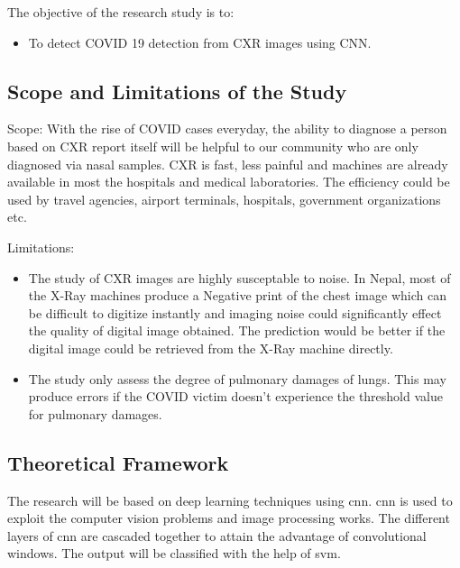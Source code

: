 The objective of the research study is to:
\begin{itemize}
    \item  To detect COVID 19 detection from CXR images using CNN. 
\end{itemize}

\subsection{Scope and Limitations of the Study}

Scope: With the rise of COVID cases everyday, the ability to diagnose a person based on CXR report itself will be helpful to our community who are only diagnosed via nasal samples. CXR is fast, less painful and machines are already available in most the hospitals and medical laboratories. The efficiency could be used by travel agencies, airport terminals, hospitals, government organizations etc.

\vspace{10pt}
Limitations:
\begin{itemize}
    \item The study of CXR images are highly susceptable to noise. In Nepal, most of the X-Ray machines produce a Negative print of the chest image which can be difficult to digitize instantly and imaging noise could significantly effect the quality of digital image obtained. The prediction would be better if the digital image could be retrieved from the X-Ray machine directly.
    \item The study only assess the degree of pulmonary damages of lungs. This may produce errors if the COVID victim doesn't experience the threshold value for pulmonary damages.
\end{itemize}  

\subsection{Theoretical Framework}

The research will be based on deep learning techniques using \acrfull{cnn}. \acrshort{cnn} is used to exploit the computer vision problems and image processing works. The different layers of \acrshort{cnn} are cascaded together to attain the advantage of convolutional windows. The output will be classified with the help of \acrfull{svm}.
